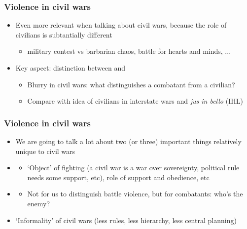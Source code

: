 \documentclass[aspectratio=43]{beamer}
\begin{document}
\begin{frame}
\frametitle{Violence in civil wars}
\centering

\begin{itemize}
  \item<1-> Even more relevant when talking about civil wars, because the role of civilians is subtantially different
  \begin{itemize}
    \item<2-> military contest vs barbarian chaos, battle for hearts and minds, ...
  \end{itemize}
  \item<3-> Key aspect: distinction between  and 
  \begin{itemize}
    \item Blurry in civil wars: what distinguishes a combatant from a civilian?
    \item Compare with idea of civilians in interstate wars and \textit{jus in bello} (IHL)
  \end{itemize}
\end{itemize}

\end{frame}

\begin{frame}
\frametitle{Violence in civil wars}
\centering

\begin{itemize}
  \item We are going to talk a lot about two (or three) important things relatively unique to civil wars
  \item<2->[1.] 
  \begin{itemize}
    \item `Object' of fighting (a civil war is a war over sovereignty, political rule needs some support, etc), role of support and obedience, etc
  \end{itemize}
  \item<3->[2.] 
  \begin{itemize}
    \item Not for us to distinguish battle violence, but for combatants: who's the enemy?
  \end{itemize}
  \item<4->[(*)] `Informality' of civil wars (less rules, less hierarchy, less central planning)
\end{itemize}

\end{frame}
\end{document}
